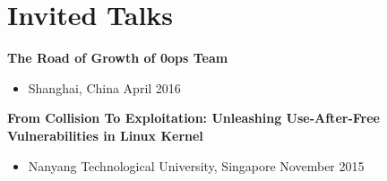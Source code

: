 \section*{Invited Talks}
\begin{description}

	\item \textbf{The Road of Growth of 0ops Team}
      \begin{itemize}
          \item Shanghai, China \dotfill April 2016
      \end{itemize}

	\item \textbf{From Collision To Exploitation: Unleashing Use-After-Free Vulnerabilities in Linux Kernel}
		\begin{itemize}
			\item Nanyang Technological University, Singapore \dotfill November 2015
		\end{itemize}

\end{description}
